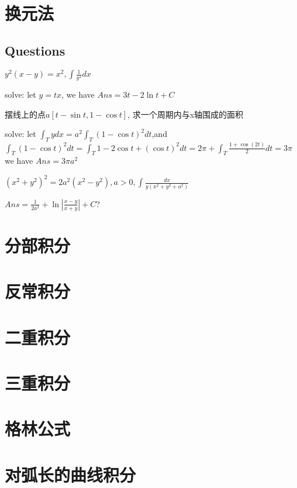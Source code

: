 \documentclass[UTF8]{../../09-Mathematics}
\begin{document}
\section{换元法}

\subsection{Questions}

\begin{question}
    $y^2(x-y) = x^2, \int \frac{1}{y^2}dx$

    solve: let $y = tx$, we have $Ans = 3t-2\ln t + C $
\end{question} 

\begin{question}
    摆线上的点$a[t- \sin t, 1- \cos t]$, 求一个周期内与x轴围成的面积

    solve: let $\int _T y dx = a^2 \int _T (1- \cos t)^2 dt$,and $\int _T (1- \cos t)^2 dt = \int _T 1- 2 \cos t + (\cos t)^2 dt = 2 \pi + \int _T \frac{1 + \cos (2t)}{2}dt = 3 \pi$ we have $Ans = 3\pi a^2 $
\end{question} 

\begin{question}
    $(x^2 + y^2)^2 = 2a^2(x^2-y^2), a>0, \int \frac{dx}{y(x^2 + y^2+ a^2)}$

    $Ans = \frac{1}{2a^2} + \ln |\frac{x-y}{x+y}| + C $?
\end{question} 


\section{分部积分}
\section{反常积分}

\section{二重积分}
\section{三重积分}

\section{格林公式}
\section{对弧长的曲线积分}
\end{document}
